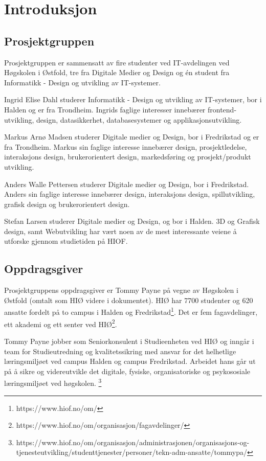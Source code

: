 \cleardoublepage
\chapter{Introduksjon}
\label{chap:intro}

\section{Prosjektgruppen}
Prosjektgruppen er sammensatt av fire studenter ved IT-avdelingen ved Høgskolen i Østfold, tre fra Digitale Medier og Design og én student fra Informatikk - Design og utvikling av IT-systemer.

Ingrid Elise Dahl studerer Informatikk - Design og utvikling av IT-systemer, bor i Halden og er fra Trondheim. Ingrids faglige interesser innebærer frontend-utvikling, design, datasikkerhet, databasesystemer og applikasjonsutvikling.

Markus Arnø Madsen studerer Digitale medier og Design, bor i Fredrikstad og er fra Trondheim. Markus sin faglige interesse innebærer design, prosjektledelse, interaksjons design, brukerorientert design, markedsføring og prosjekt/produkt utvikling.

Anders Walle Pettersen studerer Digitale medier og Design, bor i Fredrikstad. Anders sin faglige interesse innebærer design, interaksjons design, spillutvikling, grafisk design og brukerorientert design.

Stefan Larsen studerer Digitale medier og Design, og bor i Halden. 3D og Grafisk design, samt Webutvikling har vært noen av de mest interessante veiene å utforske gjennom studietiden på HIOF. 


\section{Oppdragsgiver}
Prosjektgruppens oppdragsgiver er Tommy Payne på vegne av Høgskolen i Østfold (omtalt som HIØ videre i dokumentet). HIØ har 7700 studenter og 620 ansatte fordelt på to campus i Halden og Fredrikstad\footnote{https://www.hiof.no/om/}. Det er fem fagavdelinger, ett akademi og ett senter ved HIØ\footnote{https://www.hiof.no/om/organisasjon/fagavdelinger/}.

Tommy Payne jobber som Seniorkonsulent i Studieenheten ved HIØ og inngår i team for Studieutredning og kvalitetssikring med ansvar for det helhetlige læringsmiljøet ved campus Halden og campus Fredrikstad. Arbeidet hans går ut på å sikre og videreutvikle det digitale, fysiske, organisatoriske og psykososiale læringsmiljøet ved høgskolen. \footnote{https://www.hiof.no/om/organisasjon/administrasjonen/organisasjons-og-tjenesteutvikling/studenttjenester/personer/tekn-adm-ansatte/tommypa/}

